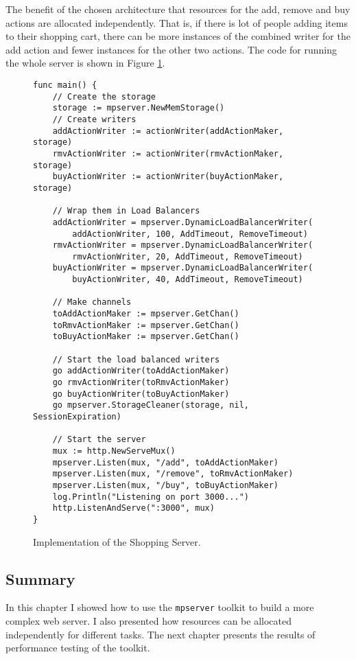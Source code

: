 The benefit of the chosen architecture that resources for the add, remove
and buy actions are allocated independently. That is, if there is lot of 
people adding items to their shopping cart, there can be more instances
of the combined writer for the add action and fewer instances for the
other two actions. The code for running the whole server is shown
in Figure \ref{fig:ShoppingCode}.
\begin{figure}[h]
\begin{lstlisting}
func main() {
    // Create the storage
    storage := mpserver.NewMemStorage()
    // Create writers
    addActionWriter := actionWriter(addActionMaker, storage)
    rmvActionWriter := actionWriter(rmvActionMaker, storage)
    buyActionWriter := actionWriter(buyActionMaker, storage)

    // Wrap them in Load Balancers
    addActionWriter = mpserver.DynamicLoadBalancerWriter(
        addActionWriter, 100, AddTimeout, RemoveTimeout)
    rmvActionWriter = mpserver.DynamicLoadBalancerWriter(
        rmvActionWriter, 20, AddTimeout, RemoveTimeout)
    buyActionWriter = mpserver.DynamicLoadBalancerWriter(
        buyActionWriter, 40, AddTimeout, RemoveTimeout)

    // Make channels
    toAddActionMaker := mpserver.GetChan()
    toRmvActionMaker := mpserver.GetChan()
    toBuyActionMaker := mpserver.GetChan()

    // Start the load balanced writers
    go addActionWriter(toAddActionMaker)
    go rmvActionWriter(toRmvActionMaker)
    go buyActionWriter(toBuyActionMaker)
    go mpserver.StorageCleaner(storage, nil, SessionExpiration)

    // Start the server
    mux := http.NewServeMux()
    mpserver.Listen(mux, "/add", toAddActionMaker)
    mpserver.Listen(mux, "/remove", toRmvActionMaker)
    mpserver.Listen(mux, "/buy", toBuyActionMaker)
    log.Println("Listening on port 3000...")
    http.ListenAndServe(":3000", mux)
}
\end{lstlisting}
\caption[scale=1.0]{Implementation of the Shopping Server.}
\label{fig:ShoppingCode}
\end{figure}

\subsection{Summary}
In this chapter I showed how to use the \texttt{mpserver} toolkit
to build a more complex web server. I also presented how resources can
be allocated independently for different tasks. The next chapter 
presents the results of performance testing of the toolkit.


